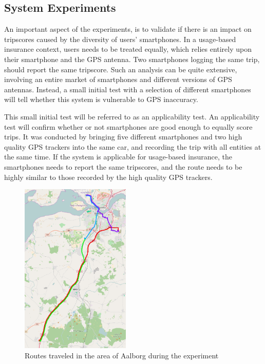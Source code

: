 \subsection{System Experiments}\label{subsec:expsystem}
An important aspect of the experiments, is to validate if there is an impact on tripscores caused by the diversity of users' smartphones. In a usage-based insurance context, users needs to be treated equally, which relies entirely upon their smartphone and the GPS antenna. Two smartphones logging the same trip, should report the same tripscore. Such an analysis can be quite extensive, involving an entire market of smartphones and different versions of GPS antennas. Instead, a small initial test with a selection of different smartphones will tell whether this system is vulnerable to GPS inaccuracy. 

This small initial test will be referred to as an applicability test. An applicability test will confirm whether or not smartphones are good enough to equally score trips. It was conducted by bringing five different smartphones and two high quality GPS trackers\citep{quality_gps_device} into the same car, and recording the trip with all entities at the same time. If the system is applicable for usage-based insurance, the smartphones needs to report the same tripscores, and the route needs to be highly similar to those recorded by the high quality GPS trackers.
 
\begin{figure}[tb]
\centering
\includegraphics[width=0.465\textwidth]{Pictures/experiment_routes}
\caption{Routes traveled in the area of Aalborg during the experiment}
\label{fig:experiment_routes}
\end{figure}

